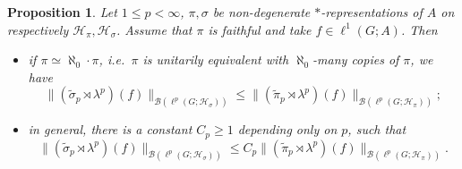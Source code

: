 \documentclass[12pt]{amsart}
\newtheorem{prop}[thm]{Proposition}
\theoremstyle{definition}
\theoremstyle{remark}
\numberwithin{equation}{section}
\newcommand{\mc}{\mathcal}
\newcommand{\wt}{\widetilde}
\begin{document}
\begin{prop}\label{prop1}
Let $1\le p<\infty$, $\pi,\sigma$ be non-degenerate $*$-representations of $A$ on respectively $\mc{H}_\pi,\mc{H}_\sigma$. Assume that $\pi$ is faithful and take $f\in\ell^1(G;A)$. Then
\begin{itemize}
\item[(i)] if $\pi\simeq \aleph_0\cdot \pi$, i.e.~$\pi$ is unitarily equivalent with $\aleph_0$-many copies of $\pi$, we have
\begin{equation}\label{eq7}
\| (\wt{\sigma}_p\rtimes \lambda^p)(f) \|_{\mc{B}(\ell^p(G;\mc{H}_\sigma))}\le
\|(\wt{\pi}_p\rtimes\lambda^p)(f)\|_{\mc{B}(\ell^p(G;\mc{H}_\pi))};
\end{equation}
\item[(ii)] in general, there is a constant $C_p\ge 1$ depending only on $p$, such that
\begin{equation}\label{eq8}
\| (\wt{\sigma}_p\rtimes \lambda^p)(f) \|_{\mc{B}(\ell^p(G;\mc{H}_\sigma))}\le C_p
\|(\wt{\pi}_p\rtimes\lambda^p)(f)\|_{\mc{B}(\ell^p(G;\mc{H}_\pi))}.
\end{equation}
\end{itemize}
\end{prop}
\end{document}
